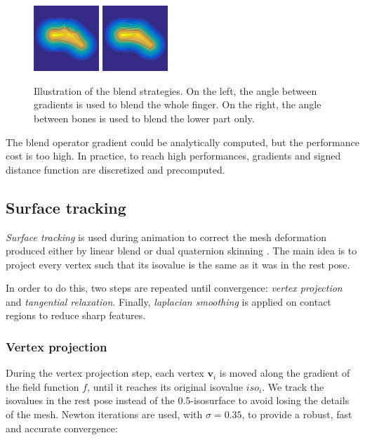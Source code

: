\documentclass[a4paper,10pt]{article}
\begin{document}
\begin{multicols}{2}
\begin{figure}[H]
\centering
\includegraphics[width=0.22\textwidth]{figs/blend_finger_gradient}
\hfill
\includegraphics[width=0.22\textwidth]{figs/blend_finger_clamp}
\caption{Illustration of the blend strategies. On the left, the angle between gradients is used to blend the whole finger. On the right, the angle between bones is used to blend the lower part only.}
\end{figure}

The blend operator gradient could be analytically computed, but the performance cost is too high.
In practice, to reach high performances, gradients and signed distance function are discretized and precomputed.


\subsection{Surface tracking}
\label{section:surface_tracking}

\emph{Surface tracking} is used during animation to correct the mesh deformation produced either by linear blend or dual quaternion skinning \cite{Kavan:2008}.
The main idea is to project every vertex such that its isovalue is the same as it was in the rest pose.

In order to do this, two steps are repeated until convergence: \emph{vertex projection} and \emph{tangential relaxation}.
Finally, \emph{laplacian smoothing} is applied on contact regions to reduce sharp features.


\subsubsection{Vertex projection}

During the vertex projection step, each vertex $\mathbf{v}_i$ is moved along the gradient of the field function $f$, until it reaches its original isovalue $iso_i$.
We track the isovalues in the rest pose instead of the 0.5-isosurface to avoid losing the details of the mesh.
Newton iterations are used, with $\sigma = 0.35$, to provide a robust, fast and accurate convergence:


\end{multicols}
\end{document}
